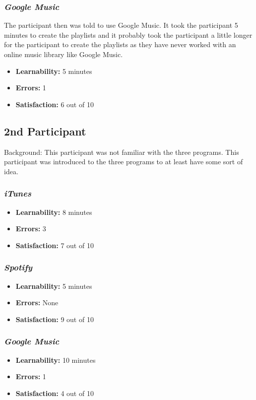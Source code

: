\documentclass{article}
\begin{document}
\begin{multicols}{2}
\subsubsection{\it Google Music}
The participant then was told to use Google Music. It took the participant 5 minutes to create the playlists and it probably took the participant a little longer for the participant to create the playlists as they have never worked with an online music library like Google Music.
\begin{itemize}
\item {\bf Learnability:} 5 minutes
	\item {\bf Errors:} 1
	\item {\bf Satisfaction:} 6 out of 10 
\end{itemize}

	
\subsection{2nd Participant}
Background: This participant was not familiar with the three programs. This participant was introduced to the three programs to at least have some sort of idea.

\subsubsection{\it iTunes}
\begin{itemize}
	\item {\bf Learnability:} 8 minutes
	\item {\bf Errors:} 3
	\item {\bf Satisfaction:} 7 out of 10 
\end{itemize}

\subsubsection{\it Spotify}
\begin{itemize}
	\item {\bf Learnability:} 5 minutes
	\item {\bf Errors:} None
	\item {\bf Satisfaction:} 9 out of 10 
\end{itemize}

\subsubsection{\it Google Music}
\begin{itemize}
\item {\bf Learnability:} 10 minutes
	\item {\bf Errors:} 1
	\item {\bf Satisfaction:} 4 out of 10 
\end{itemize}
	

\end{multicols}
\end{document}

